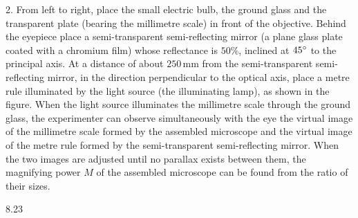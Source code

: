 2. From left to right, place the small electric bulb, the ground glass and the transparent plate (bearing the millimetre scale) in front of the objective. Behind the eyepiece place a semi-transparent semi-reflecting mirror (a plane glass plate coated with a chromium film) whose reflectance is $50\%$, inclined at $45^{\circ}$ to the principal axis. At a distance of about $250\,\mathrm{mm}$ from the semi-transparent semi-reflecting mirror, in the direction perpendicular to the optical axis, place a metre rule illuminated by the light source (the illuminating lamp), as shown in the figure. When the light source illuminates the millimetre scale through the ground glass, the experimenter can observe simultaneously with the eye the virtual image of the millimetre scale formed by the assembled microscope and the virtual image of the metre rule formed by the semi-transparent semi-reflecting mirror. When the two images are adjusted until no parallax exists between them, the magnifying power $M$ of the assembled microscope can be found from the ratio of their sizes.

\begin{figbox}{8.23}
\end{figbox}

